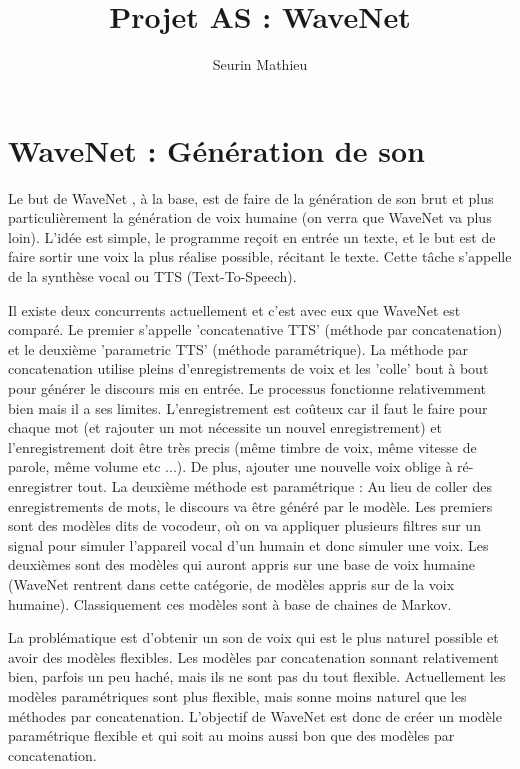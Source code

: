 \documentclass[a4paper]{article}
\title{Projet AS : WaveNet}
\author{Seurin Mathieu}
\begin{document}
\maketitle

\section{WaveNet : Génération de son}

Le but de WaveNet \cite{DBLP:journals/corr/OordDZSVGKSK16}, à la base, est de faire de la génération de son brut et plus particulièrement la génération de voix humaine (on verra que WaveNet va plus loin). L'idée est simple, le programme reçoit en entrée un texte, et le but est de faire sortir une voix la plus réalise possible, récitant le texte. Cette tâche s'appelle de la synthèse vocal ou TTS (Text-To-Speech).

Il existe deux concurrents actuellement et c'est avec eux que WaveNet est comparé. Le premier s'appelle 'concatenative TTS' (méthode par concatenation) et le deuxième 'parametric TTS' (méthode paramétrique). La méthode par concatenation utilise pleins d'enregistrements de voix et les 'colle' bout à bout pour générer le discours mis en entrée. Le processus fonctionne relativemment bien mais il a ses limites. L'enregistrement est coûteux car il faut le faire pour chaque mot (et rajouter un mot nécessite un nouvel enregistrement) et l'enregistrement doit être très precis (même timbre de voix, même vitesse de parole, même volume etc ...). De plus, ajouter une nouvelle voix oblige à ré-enregistrer tout. La deuxième méthode est paramétrique : Au lieu de coller des enregistrements de mots, le discours va être généré par le modèle. Les premiers sont des modèles dits de vocodeur, où on va appliquer plusieurs filtres sur un signal pour simuler l'appareil vocal d'un humain et donc simuler une voix.
Les deuxièmes sont des modèles qui auront appris sur une base de voix humaine (WaveNet rentrent dans cette catégorie, de modèles appris sur de la voix humaine). Classiquement ces modèles sont à base de chaines de Markov.

La problématique est d'obtenir un son de voix qui est le plus naturel possible et avoir des modèles flexibles. Les modèles par concatenation sonnant relativement bien, parfois un peu haché, mais ils ne sont pas du tout flexible. Actuellement les modèles paramétriques sont plus flexible, mais sonne moins naturel que les méthodes par concatenation.
L'objectif de WaveNet est donc de créer un modèle paramétrique flexible et qui soit au moins aussi bon que des modèles par concatenation.
\end{document}
